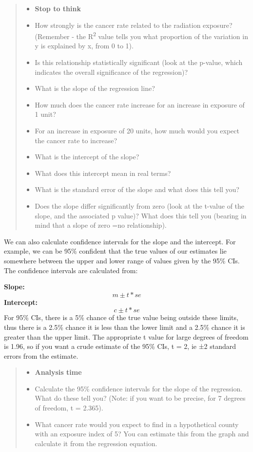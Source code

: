 \documentclass[
]{book}
\providecommand{\tightlist}{%
  \setlength{\itemsep}{0pt}\setlength{\parskip}{0pt}}
\begin{document}
\begin{quote}
\begin{itemize}
\tightlist
\item
  \textbf{Stop to think}
\item
  How strongly is the cancer rate related to the radiation exposure? (Remember - the R\textsuperscript{2} value tells you what proportion of the variation in y is explained by x, from 0 to 1).
\item
  Is this relationship statistically significant (look at the p-value, which indicates the overall significance of the regression)?
\item
  What is the slope of the regression line?
\item
  How much does the cancer rate increase for an increase in exposure of 1 unit?
\item
  For an increase in exposure of 20 units, how much would you expect the cancer rate to increase?
\item
  What is the intercept of the slope?
\item
  What does this intercept mean in real terms?
\item
  What is the standard error of the slope and what does this tell you?
\item
  Does the slope differ significantly from zero (look at the t-value of the slope, and the associated p value)? What does this tell you (bearing in mind that a slope of zero =no relationship).
\end{itemize}
\end{quote}

We can also calculate confidence intervals for the slope and the intercept. For example, we can be 95\% confident that the true values of our estimates lie somewhere between the upper and lower range of values given by the 95\% CIs. The confidence intervals are calculated from:

\textbf{Slope:}
\[
m ± t*se 
\]
\textbf{Intercept:}
\[
c ± t*se
\]
For 95\% CIs, there is a 5\% chance of the true value being outside these limits, thus there is a 2.5\% chance it is less than the lower limit and a 2.5\% chance it is greater than the upper limit. The appropriate t value for large degrees of freedom is 1.96, so if you want a crude estimate of the 95\% CIs, t = 2, ie ±2 standard errors from the estimate.

\begin{quote}
\begin{itemize}
\tightlist
\item
  \textbf{Analysis time}
\item
  Calculate the 95\% confidence intervals for the slope of the regression. What do these tell you? (Note: if you want to be precise, for 7 degrees of freedom, t = 2.365).
\item
  What cancer rate would you expect to find in a hypothetical county with an exposure index of 5? You can estimate this from the graph and calculate it from the regression equation.
\end{itemize}
\end{quote}
\end{document}
